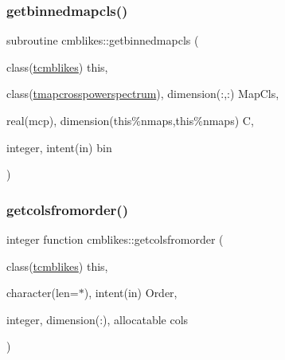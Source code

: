 \subsubsection{\texorpdfstring{getbinnedmapcls()}{getbinnedmapcls()}}
{\footnotesize\ttfamily subroutine cmblikes\+::getbinnedmapcls (\begin{DoxyParamCaption}\item[{class(\mbox{\hyperlink{structcmblikes_1_1tcmblikes}{tcmblikes}})}]{this,  }\item[{class(\mbox{\hyperlink{structcmblikes_1_1tmapcrosspowerspectrum}{tmapcrosspowerspectrum}}), dimension(\+:,\+:)}]{Map\+Cls,  }\item[{real(mcp), dimension(this\%nmaps,this\%nmaps)}]{C,  }\item[{integer, intent(in)}]{bin }\end{DoxyParamCaption})\hspace{0.3cm}{\ttfamily [private]}}

\mbox{\label{namespacecmblikes_a114579c77c600f40b2354a47106bde81}} 
\subsubsection{\texorpdfstring{getcolsfromorder()}{getcolsfromorder()}}
{\footnotesize\ttfamily integer function cmblikes\+::getcolsfromorder (\begin{DoxyParamCaption}\item[{class(\mbox{\hyperlink{structcmblikes_1_1tcmblikes}{tcmblikes}})}]{this,  }\item[{character(len=$\ast$), intent(in)}]{Order,  }\item[{integer, dimension(\+:), allocatable}]{cols }\end{DoxyParamCaption})\hspace{0.3cm}{\ttfamily [private]}}

\mbox{\label{namespacecmblikes_a887e1b2647525630e45abcf6e96ffb13}} 
